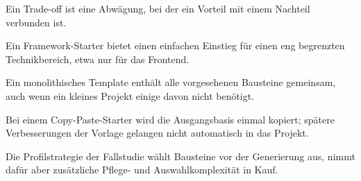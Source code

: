 \begin{beginnerstatement}

Ein Trade-off ist eine Abwägung, bei der ein Vorteil mit einem Nachteil
verbunden ist.

Ein Framework-Starter bietet einen einfachen Einstieg für einen eng
begrenzten Technikbereich, etwa nur für das Frontend.

Ein monolithisches Template enthält alle vorgesehenen Bausteine gemeinsam,
auch wenn ein kleines Projekt einige davon nicht benötigt.

Bei einem Copy-Paste-Starter wird die Ausgangsbasis einmal kopiert; spätere
Verbesserungen der Vorlage gelangen nicht automatisch in das Projekt.

Die Profilstrategie der Fallstudie wählt Bausteine vor der Generierung aus,
nimmt dafür aber zusätzliche Pflege- und Auswahlkomplexität in Kauf.

\end{beginnerstatement}
